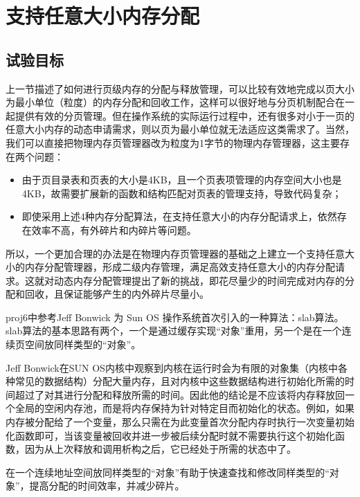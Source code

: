 \section{支持任意大小内存分配}\label{ux652fux6301ux4efbux610fux5927ux5c0fux5185ux5b58ux5206ux914d}

\subsection{试验目标}\label{ux8bd5ux9a8cux76eeux6807}

上一节描述了如何进行页级内存的分配与释放管理，可以比较有效地完成以页大小为最小单位（粒度）的内存分配和回收工作，这样可以很好地与分页机制配合在一起提供有效的分页管理。但在操作系统的实际运行过程中，还有很多对小于一页的任意大小内存的动态申请需求，则以页为最小单位就无法适应这类需求了。当然，我们可以直接把物理内存页管理器改为粒度为1字节的物理内存管理器，这主要存在两个问题：

\begin{itemize}
\item
  由于页目录表和页表的大小是4KB，且一个页表项管理的内存空间大小也是4KB，故需要扩展新的函数和结构匹配对页表的管理支持，导致代码复杂；
\item
  即使采用上述4种内存分配算法，在支持任意大小的内存分配请求上，依然存在效率不高，有外碎片和内碎片等问题。
\end{itemize}

所以，一个更加合理的办法是在物理内存页管理器的基础之上建立一个支持任意大小的内存分配管理器，形成二级内存管理，满足高效支持任意大小的内存分配请求。这就对动态内存分配管理提出了新的挑战，即花尽量少的时间完成对内存的分配和回收，且保证能够产生的内外碎片尽量小。

proj6中参考Jeff Bonwick 为 Sun OS
操作系统首次引入的一种算法：slab算法。slab算法的基本思路有两个，一个是通过缓存实现``对象''重用，另一个是在一个连续页空间放同样类型的``对象''。

Jeff Bonwick在SUN
OS内核中观察到内核在运行时会为有限的对象集（内核中各种常见的数据结构）分配大量内存，且对内核中这些数据结构进行初始化所需的时间超过了对其进行分配和释放所需的时间。因此他的结论是不应该将内存释放回一个全局的空闲内存池，而是将内存保持为针对特定目而初始化的状态。例如，如果内存被分配给了一个变量，那么只需在为此变量首次分配内存时执行一次变量初始化函数即可，当该变量被回收并进一步被后续分配时就不需要执行这个初始化函数，因为从上次释放和调用析构之后，它已经处于所需的状态中了。

在一个连续地址空间放同样类型的``对象''有助于快速查找和修改同样类型的``对象''，提高分配的时间效率，并减少碎片。

